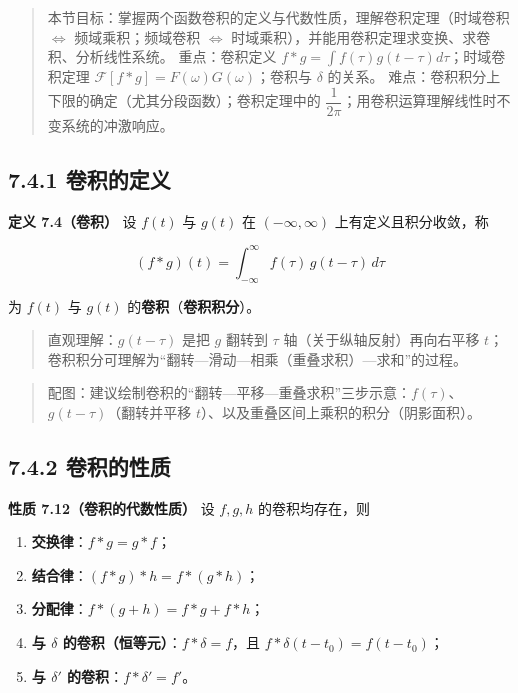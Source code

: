\begin{quote}
本节目标：掌握两个函数卷积的定义与代数性质，理解卷积定理（时域卷积
\(\Longleftrightarrow\) 频域乘积；频域卷积 \(\Longleftrightarrow\)
时域乘积），并能用卷积定理求变换、求卷积、分析线性系统。 重点：卷积定义
\(f*g=\int f(\tau)g(t-\tau)d\tau\)；时域卷积定理
\(\mathcal F[f*g]=F(\omega)G(\omega)\)；卷积与 \(\delta\) 的关系。
难点：卷积积分上下限的确定（尤其分段函数）；卷积定理中的
\(\dfrac{1}{2\pi}\)；用卷积运算理解线性时不变系统的冲激响应。
\end{quote}

\subsection{7.4.1 卷积的定义}\label{ux5377ux79efux7684ux5b9aux4e49}

\textbf{定义 7.4（卷积）} 设 \(f(t)\) 与 \(g(t)\) 在
\((-\infty,\infty)\) 上有定义且积分收敛，称

\[
(f*g)(t)=\int_{-\infty}^{\infty}f(\tau)\,g(t-\tau)\,d\tau
\]

为 \(f(t)\) 与 \(g(t)\) 的\textbf{卷积}（\textbf{卷积积分}）。

\begin{quote}
直观理解：\(g(t-\tau)\) 是把 \(g\) 翻转到 \(\tau\)
轴（关于纵轴反射）再向右平移
\(t\)；卷积积分可理解为``翻转---滑动---相乘（重叠求积）---求和''的过程。
\end{quote}

\begin{quote}
配图：建议绘制卷积的``翻转---平移---重叠求积''三步示意：\(f(\tau)\)、\(g(t-\tau)\)（翻转并平移
\(t\)）、以及重叠区间上乘积的积分（阴影面积）。
\end{quote}

\subsection{7.4.2 卷积的性质}\label{ux5377ux79efux7684ux6027ux8d28}

\textbf{性质 7.12（卷积的代数性质）} 设 \(f,g,h\) 的卷积均存在，则

\begin{enumerate}
\def\labelenumi{\arabic{enumi}.}
\tightlist
\item
  \textbf{交换律}：\(f*g=g*f\)；
\item
  \textbf{结合律}：\((f*g)*h=f*(g*h)\)；
\item
  \textbf{分配律}：\(f*(g+h)=f*g+f*h\)；
\item
  \textbf{与 \(\delta\) 的卷积（恒等元）}：\(f*\delta=f\)，且
  \(f*\delta(t-t_0)=f(t-t_0)\)；
\item
  \textbf{与 \(\delta'\) 的卷积}：\(f*\delta'=f'\)。
\end{enumerate}

